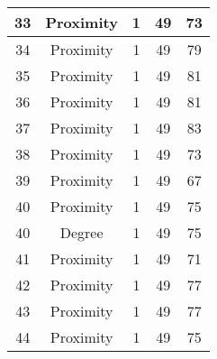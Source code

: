 \documentclass[results.tex]{subfiles}
\begin{document}
\begin{center}
\begin{tabular}{| c || c | c | c | c |}
            \hline
            33                      & Proximity                    & 1                      & 49                      & 73                   \\
            \hline
            34                      & Proximity                    & 1                      & 49                      & 79                   \\
            \hline
            35                      & Proximity                    & 1                      & 49                      & 81                   \\
            \hline
            36                      & Proximity                    & 1                      & 49                      & 81                   \\
            \hline
            37                      & Proximity                    & 1                      & 49                      & 83                   \\
            \hline
            38                      & Proximity                    & 1                      & 49                      & 73                   \\
            \hline
            39                      & Proximity                    & 1                      & 49                      & 67                   \\
            \hline
            40                      & Proximity                    & 1                      & 49                      & 75                   \\
            \hline
            40                      & Degree                       & 1                      & 49                      & 75                   \\
            \hline
            41                      & Proximity                    & 1                      & 49                      & 71                   \\
            \hline
            42                      & Proximity                    & 1                      & 49                      & 77                   \\
            \hline
            43                      & Proximity                    & 1                      & 49                      & 77                   \\
            \hline
            44                      & Proximity                    & 1                      & 49                      & 75                   \\

\end{tabular}
\end{center}
\end{document}
